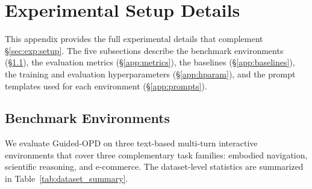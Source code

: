 \documentclass[11pt]{article}
\begin{document}

%


\appendix

\section{Experimental Setup Details}
\label{app:exp_setup}

This appendix provides the full experimental details that complement \S\ref{sec:exp:setup}. The five subsections describe the benchmark environments (\S\ref{app:bench}), the evaluation metrics (\S\ref{app:metrics}), the baselines (\S\ref{app:baselines}), the training and evaluation hyperparameters (\S\ref{app:hparam}), and the prompt templates used for each environment (\S\ref{app:prompts}).

\subsection{Benchmark Environments}
\label{app:bench}

We evaluate Guided-OPD on three text-based multi-turn interactive environments that cover three complementary task families: embodied navigation, scientific reasoning, and e-commerce. The dataset-level statistics are summarized in Table~\ref{tab:dataset_summary}.
\end{document}
